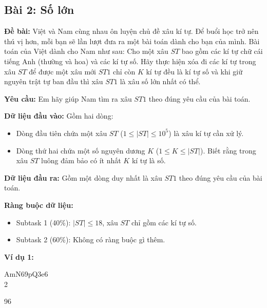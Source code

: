 \documentclass[12pt]{scrartcl}  %
\begin{document}
\subsection{Bài 2: Số lớn}
\textbf{Đề bài:}
Việt và Nam cùng nhau ôn luyện chủ đề xâu kí tự. Để buổi học trở nên thú vị hơn, mỗi bạn sẽ lần lượt đưa ra một bài toán 
dành cho bạn của mình. Bài toán của Việt dành cho Nam như sau: Cho một xâu $ST$ bao gồm các kí tự chữ cái tiếng Anh (thường và hoa) và 
các kí tự số. Hãy thực hiện xóa đi các kí tự trong xâu $ST$ để được một xâu mới $ST1$ chỉ còn $K$ kí tự đều là kí tự số và khi giữ nguyên trật tự ban đầu 
thì xâu $ST1$ là xâu số lớn nhất có thể.

\textbf{Yêu cầu:}
Em hãy giúp Nam tìm ra xâu $ST1$ theo đúng yêu cầu của bài toán.

\textbf{Dữ liệu đầu vào:}
Gồm hai dòng:
\begin{itemize}
    \item Dòng đầu tiên chứa một xâu $ST$ ($1 \leq |ST| \leq 10^5$) là xâu kí tự cần xử lý.
    \item Dòng thứ hai chứa một số nguyên dương $K$ ($1 \leq K \leq |ST|$). Biết rằng trong xâu $ST$ luông đảm bảo có ít nhất $K$ kí tự là số. 
\end{itemize}

\textbf{Dữ liệu đầu ra:}
Gồm một dòng duy nhất là xâu $ST1$ theo đúng yêu cầu của bài toán.

\textbf{Ràng buộc dữ liệu:}
\begin{itemize}
    \item Subtask 1 (40\%): $|ST| \leq 18$, xâu $ST$ chỉ gồm các kí tự số.
    \item Subtask 2 (60\%): Không có ràng buộc gì thêm.
\end{itemize}

\textbf{Ví dụ 1:}
\begin{tcolorbox}[colback=gray!5!white, colframe=blue!50!black, title=Input]
AmN69pQ3e6\\
2
\end{tcolorbox}
\begin{tcolorbox}[colback=gray!5!white, colframe=green!50!black, title=Output]
96
\end{tcolorbox}
\end{document}
